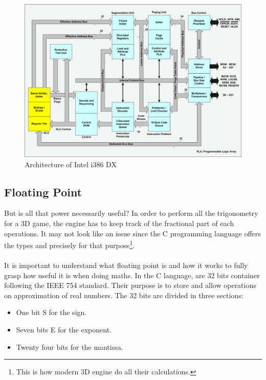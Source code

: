 \documentclass[book.tex]{subfiles}
\begin{document}
\begin{figure}[H]
\centering
  
      \includegraphics[width=\textwidth]{imgs/hardware/80386DX_arch.png}
\caption{Architecture of Intel i386 DX}
\end{figure}








  \subsection{Floating Point}
  
   But is all that power necessarily useful? In order to perform all the trigonometry for a 3D game, the engine has to keep track of the fractional part of each operations. It may not look like an issue since the C programming language offers the types  and  precisely for that purpose\footnote{This is how modern 3D engine do all their calculations.}.\\
\\
It is important to understand what floating point is and how it works to fully grasp how useful it is when doing maths. In the C language,  are 32 bits container following the IEEE 754 standard. Their purpose is to store and allow operations on approximation of real numbers. The 32 bits are divided in three sections:\\
\begin{itemize}
  \item One bit S for the sign.
  \item Seven bits E for the exponent.
  \item Twenty four bits for the mantissa.
\end{itemize} 
\end{document}
